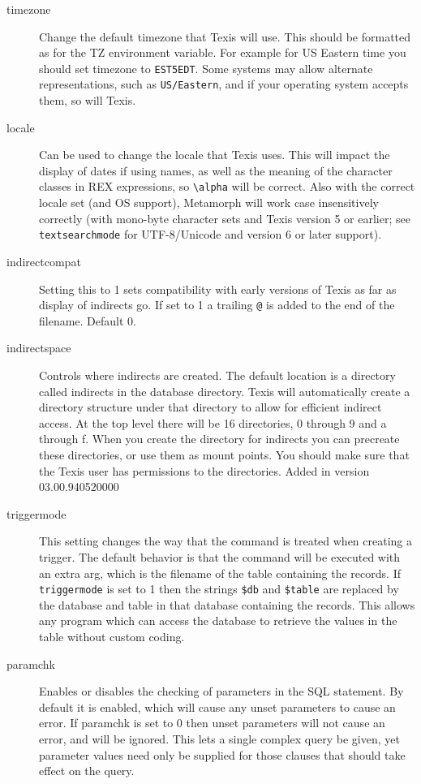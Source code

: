 \begin{description}
\item[timezone] Change the default timezone that Texis will use.  This
should be formatted as for the TZ environment variable.  For example for
US Eastern time you should set timezone to \verb`EST5EDT`.  Some systems
may allow alternate representations, such as \verb`US/Eastern`, and if
your operating system accepts them, so will Texis.

\item[locale] Can be used to change the locale that Texis uses.  This
  will impact the display of dates if using names, as well as the
  meaning of the character classes in REX expressions, so
  \verb`\alpha` will be correct.  Also with the correct locale set
  (and OS support), Metamorph will work case insensitively correctly
  (with mono-byte character sets and Texis version 5 or earlier; see
  \verb`textsearchmode` for UTF-8/Unicode and version 6 or later
  support).

\item[indirectcompat]  Setting this to 1 sets compatibility with early
versions of Texis as far as display of indirects go.  If set to 1 a
trailing \verb`@` is added to the end of the filename.  Default 0.

\item[indirectspace]  Controls where indirects are created.  The default
location is a directory called indirects in the database directory.  Texis
will automatically create a directory structure under that directory to
allow for efficient indirect access.  At the top level there will be 16
directories, 0 through 9 and a through f.  When you create the directory
for indirects you can precreate these directories, or use them as mount
points.  You should make sure that the Texis user has permissions to the
directories.
Added in version 03.00.940520000

\item[triggermode] This setting changes the way that the command is treated
when creating a trigger.  The default behavior is that the command will be
executed with an extra arg, which is the filename of the table containing
the records.  If \verb`triggermode` is set to 1 then the strings \verb`$db`
and \verb`$table` are replaced by the database and table in that database
containing the records.  This allows any program which can access the
database to retrieve the values in the table without custom coding.

\item[paramchk] Enables or disables the checking of parameters in the
SQL statement.  By default it is enabled, which will cause any unset
parameters to cause an error.  If paramchk is set to 0 then unset
parameters will not cause an error, and will be ignored.  This lets a
single complex query be given, yet parameter values need only be
supplied for those clauses that should take effect on the query.


\end{description}
